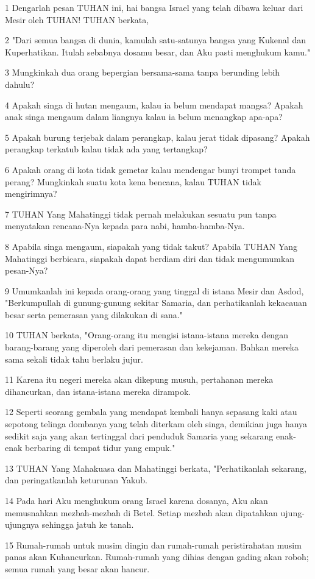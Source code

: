 \par 1 Dengarlah pesan TUHAN ini, hai bangsa Israel yang telah dibawa keluar dari Mesir oleh TUHAN! TUHAN berkata,
\par 2 "Dari semua bangsa di dunia, kamulah satu-satunya bangsa yang Kukenal dan Kuperhatikan. Itulah sebabnya dosamu besar, dan Aku pasti menghukum kamu."
\par 3 Mungkinkah dua orang bepergian bersama-sama tanpa berunding lebih dahulu?
\par 4 Apakah singa di hutan mengaum, kalau ia belum mendapat mangsa? Apakah anak singa mengaum dalam liangnya kalau ia belum menangkap apa-apa?
\par 5 Apakah burung terjebak dalam perangkap, kalau jerat tidak dipasang? Apakah perangkap terkatub kalau tidak ada yang tertangkap?
\par 6 Apakah orang di kota tidak gemetar kalau mendengar bunyi trompet tanda perang? Mungkinkah suatu kota kena bencana, kalau TUHAN tidak mengirimnya?
\par 7 TUHAN Yang Mahatinggi tidak pernah melakukan sesuatu pun tanpa menyatakan rencana-Nya kepada para nabi, hamba-hamba-Nya.
\par 8 Apabila singa mengaum, siapakah yang tidak takut? Apabila TUHAN Yang Mahatinggi berbicara, siapakah dapat berdiam diri dan tidak mengumumkan pesan-Nya?
\par 9 Umumkanlah ini kepada orang-orang yang tinggal di istana Mesir dan Asdod, "Berkumpullah di gunung-gunung sekitar Samaria, dan perhatikanlah kekacauan besar serta pemerasan yang dilakukan di sana."
\par 10 TUHAN berkata, "Orang-orang itu mengisi istana-istana mereka dengan barang-barang yang diperoleh dari pemerasan dan kekejaman. Bahkan mereka sama sekali tidak tahu berlaku jujur.
\par 11 Karena itu negeri mereka akan dikepung musuh, pertahanan mereka dihancurkan, dan istana-istana mereka dirampok.
\par 12 Seperti seorang gembala yang mendapat kembali hanya sepasang kaki atau sepotong telinga dombanya yang telah diterkam oleh singa, demikian juga hanya sedikit saja yang akan tertinggal dari penduduk Samaria yang sekarang enak-enak berbaring di tempat tidur yang empuk."
\par 13 TUHAN Yang Mahakuasa dan Mahatinggi berkata, "Perhatikanlah sekarang, dan peringatkanlah keturunan Yakub.
\par 14 Pada hari Aku menghukum orang Israel karena dosanya, Aku akan memusnahkan mezbah-mezbah di Betel. Setiap mezbah akan dipatahkan ujung-ujungnya sehingga jatuh ke tanah.
\par 15 Rumah-rumah untuk musim dingin dan rumah-rumah peristirahatan musim panas akan Kuhancurkan. Rumah-rumah yang dihias dengan gading akan roboh; semua rumah yang besar akan hancur.

